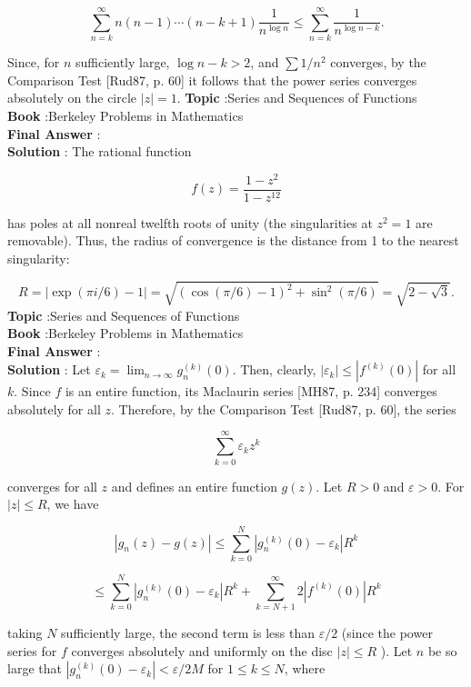 \documentclass[10pt]{article}
\begin{document}
$$
\sum_{n=k}^{\infty} n(n-1) \cdots(n-k+1) \frac{1}{n^{\log n}} \leqslant \sum_{n=k}^{\infty} \frac{1}{n^{\log n-k}} .
$$

Since, for $n$ sufficiently large, $\log n-k>2$, and $\sum 1 / n^{2}$ converges, by the Comparison Test [Rud87, p. 60] it follows that the power series converges absolutely on the circle $|z|=1$.
\textbf{Topic} :Series and Sequences of Functions \\
\textbf{Book} :Berkeley Problems in Mathematics\\
\textbf{Final Answer} :\\


\textbf{Solution} : The rational function

$$
f(z)=\frac{1-z^{2}}{1-z^{12}}
$$

has poles at all nonreal twelfth roots of unity (the singularities at $z^{2}=1$ are removable). Thus, the radius of convergence is the distance from 1 to the nearest singularity:

$$
R=|\exp (\pi i / 6)-1|=\sqrt{(\cos (\pi / 6)-1)^{2}+\sin ^{2}(\pi / 6)}=\sqrt{2-\sqrt{3}} .
$$
\textbf{Topic} :Series and Sequences of Functions \\
\textbf{Book} :Berkeley Problems in Mathematics\\
\textbf{Final Answer} :\\


\textbf{Solution} : Let $\varepsilon_{k}=\lim _{n \rightarrow \infty} g_{n}^{(k)}(0)$. Then, clearly, $\left|\varepsilon_{k}\right| \leqslant\left|f^{(k)}(0)\right|$ for all $k$. Since $f$ is an entire function, its Maclaurin series [MH87, p. 234] converges absolutely for all $z$. Therefore, by the Comparison Test [Rud87, p. 60], the series

$$
\sum_{k=0}^{\infty} \varepsilon_{k} z^{k}
$$

converges for all $z$ and defines an entire function $g(z)$. Let $R>0$ and $\varepsilon>0$. For $|z| \leqslant R$, we have

$$
\left|g_{n}(z)-g(z)\right| \leqslant \sum_{k=0}^{N}\left|g_{n}^{(k)}(0)-\varepsilon_{k}\right| R^{k}
$$



$$
\leqslant \sum_{k=0}^{N}\left|g_{n}^{(k)}(0)-\varepsilon_{k}\right| R^{k}+\sum_{k=N+1}^{\infty} 2\left|f^{(k)}(0)\right| R^{k}
$$

taking $N$ sufficiently large, the second term is less than $\varepsilon / 2$ (since the power series for $f$ converges absolutely and uniformly on the disc $|z| \leqslant R$ ). Let $n$ be so large that $\left|g_{n}^{(k)}(0)-\varepsilon_{k}\right|<\varepsilon / 2 M$ for $1 \leqslant k \leqslant N$, where
\end{document}
